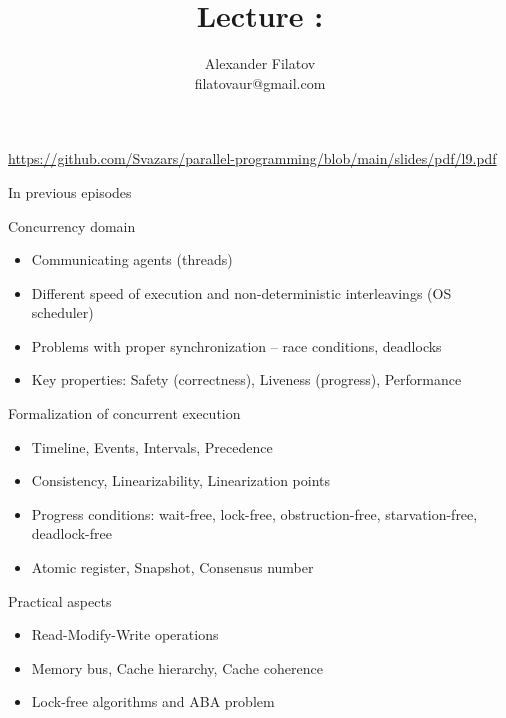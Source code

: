


\title[]{Lecture \cacheCoherencyNum: \cacheCoherencyTopic}
\subtitle[]{\cacheCoherencyKey}

\author[]{Alexander Filatov\\ filatovaur@gmail.com}
\date{}



\begin{frame}
  \titlepage
  \url{https://github.com/Svazars/parallel-programming/blob/main/slides/pdf/l9.pdf}
\end{frame}


\begin{frame}{In previous episodes}

Concurrency domain
\begin{itemize}
 \item Communicating agents (threads)
 \item Different speed of execution and non-deterministic interleavings (OS scheduler)
 \item Problems with proper synchronization -- race conditions, deadlocks
 \item Key properties: Safety (correctness), Liveness (progress), Performance
\end{itemize}

Formalization of concurrent execution
\begin{itemize}
 \item Timeline, Events, Intervals, Precedence
 \item Consistency, Linearizability, Linearization points
 \item Progress conditions: wait-free, lock-free, obstruction-free, starvation-free, deadlock-free
 \item Atomic register, Snapshot, Consensus number
\end{itemize}

Practical aspects
\begin{itemize}
 \item Read-Modify-Write operations
 \item Memory bus, Cache hierarchy, Cache coherence
 \item Lock-free algorithms and ABA problem
\end{itemize}
\end{frame}

